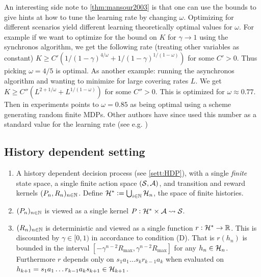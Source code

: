 \begin{rem}
An interesting side note to \cref{thm:mansour2003} is that
one can use the bounds to give hints at how to tune the learning rate
by changing $\omega$. Optimizing for different scenarios yield
different learning theoretically optimal values for $\omega$.
For example if we want to optimize for the bound on $K$ for 
$\gamma \to 1$ using the synchronos algorithm,
we get the following rate (treating other variables as constant)
$K \geq C'(1/(1-\gamma)^{4/\omega} + 1/(1-\gamma)^{1/(1-\omega)})$
for some $C'>0$.
Thus picking $\omega = 4/5$ is optimal.
As another example: running the asynchronos algorithm and wanting to
minimize for large covering rates $L$. We get
$K \geq C''(L^{2+1/\omega} + L^{1/(1-\omega)})$
for some $C'' > 0$.
This is optimized for $\omega \approx 0.77$.
Then in  experiments points to $\omega = 0.85$ as being
optimal using a scheme generating random finite MDPs.
Other authors have since used this number as a standard
value for the learning rate
(see e.g. ) %
\end{rem}

\subsection{History dependent setting}

\begin{sett}
  \leavevmode
  \begin{enumerate}
    \item A history dependent decision process (see \cref{sett:HDP}),
      with a single \emph{finite} state space,
      a single finite action space $(\mathcal{S}, \mathcal{A})$,
      and transition and reward kernels $(P_n, R_n)_{n \in \mathbb{N}}$.
      Define $\mathcal{H}^* \vcentcolon= \bigcup_{i \in \mathbb{N}} \mathcal{H}_n$,
      the space of finite histories.
    \item $(P_n)_{n \in \mathbb{N}}$ is viewed as a single kernel
      $P : \mathcal{H}^* \times \mathcal{A} \leadsto \mathcal{S}$.
    \item $(R_n)_{n \in \mathbb{N}}$ is deterministic and viewed as a single function
      $r : \mathcal{H}^* \to \mathbb{R}$.
      This is discounted by $\gamma \in [0,1)$ in accordance to
      condition (D). That is
      $r(h_n)$ is bounded in the interval
      $[-\gamma^{n-2}R_{\max}, \gamma^{n-2} R_{\max}]$ for any
      $h_n \in \mathcal{H}_n$.
      Furthermore $r$ depends only on $s_1 a_1 \dots s_k r_{k-1} a_k$
      when evaluated on
      $h_{k+1} = s_1 a_1 \dots r_{k-1} a_k s_{k+1} \in \mathcal{H}_{k+1}$.
  \end{enumerate}
  \label{sett:HDP_MH}
\end{sett}

